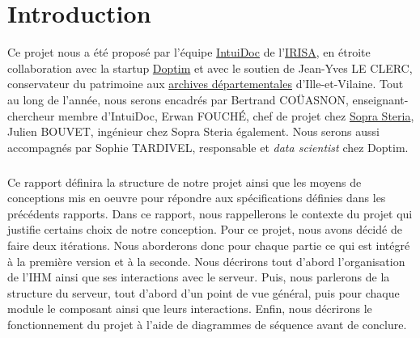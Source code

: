 \chapter{Introduction}
\setcounter{page}{1}
\pagestyle{fancy}
\fancyhf{}
\cfoot[\thepage]{\thepage}

Ce projet nous a été proposé par l’équipe \href{https://www-intuidoc.irisa.fr/}{IntuiDoc} de l’\href{https://www.irisa.fr/}{IRISA}, en étroite collaboration avec la startup \href{http://www.doptim.eu}{Doptim} et avec le soutien de Jean-Yves LE CLERC, conservateur du patrimoine aux \href{http://archives.ille-et-vilaine.fr/fr}{archives départementales} d'Ille-et-Vilaine. Tout au long de l’année, nous serons encadrés par Bertrand COÜASNON, enseignant-chercheur membre d'IntuiDoc, Erwan FOUCHÉ, chef de projet chez \href{https://www.soprasteria.com/fr}{Sopra Steria}, Julien BOUVET, ingénieur chez Sopra Steria également. Nous serons aussi accompagnés par Sophie TARDIVEL, responsable et \textit{data scientist} chez Doptim.

\paragraph{}
Ce rapport définira la structure de notre projet ainsi que les moyens de conceptions mis en oeuvre pour répondre aux spécifications définies dans les précédents rapports.
Dans ce rapport, nous rappellerons le contexte du projet qui justifie certains choix de notre conception. Pour ce projet, nous avons décidé de faire deux itérations. Nous aborderons donc pour chaque partie ce qui est intégré à la première version et à la seconde. Nous décrirons tout d'abord l'organisation de l'IHM ainsi que ses interactions avec le serveur. Puis, nous parlerons de la structure du serveur, tout d'abord d'un point de vue général, puis pour chaque module le composant ainsi que leurs interactions. Enfin, nous décrirons le fonctionnement du projet à l'aide de diagrammes de séquence avant de conclure.